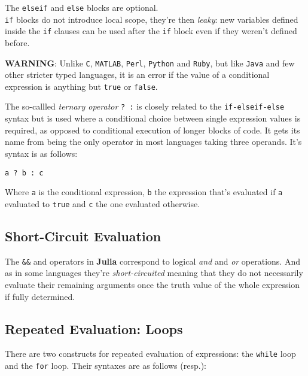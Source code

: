 \documentclass[
]{article}
\begin{document}
The \texttt{elseif} and \texttt{else} blocks are optional.\\
\texttt{if} blocks do not introduce local scope, they're then
\emph{leaky}: new variables defined inside the \texttt{if} clauses can
be used after the \texttt{if} block even if they weren't defined before.

\textbf{WARNING}: Unlike \texttt{C}, \texttt{MATLAB}, \texttt{Perl},
\texttt{Python} and \texttt{Ruby}, but like \texttt{Java} and few other
stricter typed languages, it is an error if the value of a conditional
expression is anything but \texttt{true} or \texttt{false}.

The so-callled \emph{ternary operator} \texttt{?\ :} is closely related
to the \texttt{if-elseif-else} syntax but is used where a conditional
choice between single expression values is required, as opposed to
conditional execution of longer blocks of code. It gets its name from
being the only operator in most languages taking three operands. It's
syntax is as follows:

\begin{verbatim}
a ? b : c
\end{verbatim}

Where \texttt{a} is the conditional expression, \texttt{b} the
expression that's evaluated if \texttt{a} evaluated to \texttt{true} and
\texttt{c} the one evaluated otherwise.

\hypertarget{short-circuit-evaluation.}{%
\subsection{\texorpdfstring{Short-Circuit
Evaluation}{Short-Circuit Evaluation}}\label{short-circuit-evaluation.}}

The \texttt{\&\&} and \texttt{\textbar{}\textbar{}} operators in
\textbf{Julia} correspond to logical \emph{and} and \emph{or}
operations. And as in some languages they're \emph{short-circuited}
meaning that they do not necessarily evaluate their remaining arguments
once the truth value of the whole expression if fully determined.

\hypertarget{repeated-evaluation-loops}{%
\subsection{\texorpdfstring{Repeated Evaluation:
Loops}{Repeated Evaluation: Loops}}\label{repeated-evaluation-loops}}

There are two constructs for repeated evaluation of expressions: the
\texttt{while} loop and the \texttt{for} loop. Their syntaxes are as
follows (resp.):
\end{document}

